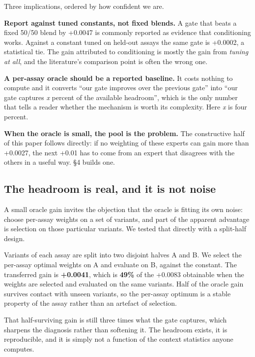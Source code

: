 \documentclass{article}
\begin{document}
Three implications, ordered by how confident we are.

\textbf{Report against tuned constants, not fixed blends.} A gate that beats a fixed 50/50 blend by +0.0047
is commonly reported as evidence that conditioning works. Against a constant tuned on held-out assays
the same gate is +0.0002, a statistical tie. The gain attributed to conditioning is mostly the gain from
\emph{tuning at all}, and the literature's comparison point is often the wrong one.

\textbf{A per-assay oracle should be a reported baseline.} It costs nothing to compute and it converts ``our
gate improves over the previous gate'' into ``our gate captures \emph{x} percent of the available headroom'',
which is the only number that tells a reader whether the mechanism is worth its complexity. Here \emph{x} is
four percent.

\textbf{When the oracle is small, the pool is the problem.} The constructive half of this paper follows
directly: if no weighting of these experts can gain more than +0.0027, the next +0.01 has to come from
an expert that disagrees with the others in a useful way. §4 builds one.

\subsection{The headroom is real, and it is not noise}\label{the-headroom-is-real-and-it-is-not-noise}

A small oracle gain invites the objection that the oracle is fitting its own noise: choose per-assay
weights on a set of variants, and part of the apparent advantage is selection on those particular
variants. We tested that directly with a split-half design.

Variants of each assay are split into two disjoint halves A and B. We select the per-assay optimal
weights on A and evaluate on B, against the constant. The transferred gain is \textbf{+0.0041}, which is
\textbf{49\%} of the +0.0083 obtainable when the weights are selected and evaluated on the same variants.
Half of the oracle gain survives contact with unseen variants, so the per-assay optimum is a stable
property of the assay rather than an artefact of selection.

That half-surviving gain is still three times what the gate captures, which sharpens the diagnosis
rather than softening it. The headroom exists, it is reproducible, and it is simply not a function of
the context statistics anyone computes.
\end{document}
